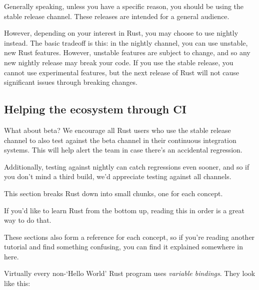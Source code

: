 \documentclass[a4paper,]{book}
\begin{document}
Generally speaking, unless you have a specific reason, you should be
using the stable release channel. These releases are intended for a
general audience.

However, depending on your interest in Rust, you may choose to use
nightly instead. The basic tradeoff is this: in the nightly channel, you
can use unstable, new Rust features. However, unstable features are
subject to change, and so any new nightly release may break your code.
If you use the stable release, you cannot use experimental features, but
the next release of Rust will not cause significant issues through
breaking changes.

\subsection{Helping the ecosystem through
CI}\label{helping-the-ecosystem-through-ci}

What about beta? We encourage all Rust users who use the stable release
channel to also test against the beta channel in their continuous
integration systems. This will help alert the team in case there's an
accidental regression.

Additionally, testing against nightly can catch regressions even sooner,
and so if you don't mind a third build, we'd appreciate testing against
all channels.


This section breaks Rust down into small chunks, one for each concept.

If you'd like to learn Rust from the bottom up, reading this in order is
a great way to do that.

These sections also form a reference for each concept, so if you're
reading another tutorial and find something confusing, you can find it
explained somewhere in here.


Virtually every non-`Hello World' Rust program uses \emph{variable
bindings}. They look like this:
\end{document}
